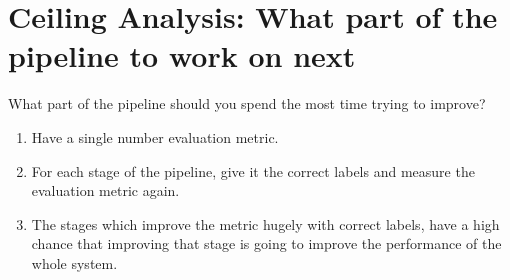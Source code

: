 \section{Ceiling Analysis: What part of the pipeline to work on next}
What part of the pipeline should you spend the most time trying to improve?
\begin{enumerate}
	\item Have a single number evaluation metric.
	\item For each stage of the pipeline, give it the correct labels and
	      measure the evaluation metric again.
	\item The stages which improve the metric hugely with correct labels,
	      have a high chance that improving that stage is going to improve
	      the performance of the whole system.
\end{enumerate}


